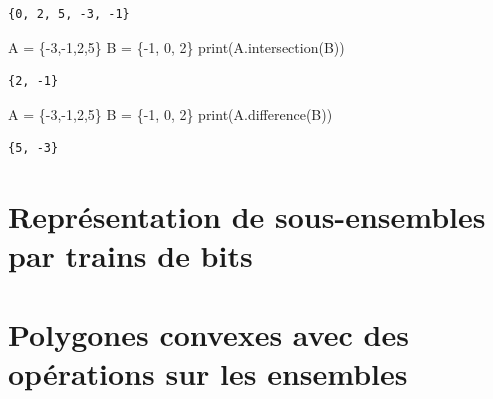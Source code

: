 \documentclass[
  letterpaper,
]{scrbook}
\newenvironment{Shaded}{}{}
\newcommand{\BuiltInTok}[1]{#1}
\newcommand{\DecValTok}[1]{\textcolor[rgb]{0.25,0.63,0.44}{#1}}
\newcommand{\NormalTok}[1]{#1}
\newcommand{\OperatorTok}[1]{\textcolor[rgb]{0.40,0.40,0.40}{#1}}
\theoremstyle{definition}
\theoremstyle{definition}
\theoremstyle{plain}
\theoremstyle{remark}
\begin{document}
\begin{verbatim}
{0, 2, 5, -3, -1}
\end{verbatim}

\hypertarget{intersection-python}{}
\begin{Shaded}
\begin{Highlighting}[]
\NormalTok{A }\OperatorTok{=}\NormalTok{ \{}\OperatorTok{{-}}\DecValTok{3}\NormalTok{,}\OperatorTok{{-}}\DecValTok{1}\NormalTok{,}\DecValTok{2}\NormalTok{,}\DecValTok{5}\NormalTok{\}}
\NormalTok{B }\OperatorTok{=}\NormalTok{ \{}\OperatorTok{{-}}\DecValTok{1}\NormalTok{, }\DecValTok{0}\NormalTok{, }\DecValTok{2}\NormalTok{\}}
\BuiltInTok{print}\NormalTok{(A.intersection(B))}
\end{Highlighting}
\end{Shaded}

\begin{verbatim}
{2, -1}
\end{verbatim}

\hypertarget{difference-python}{}
\begin{Shaded}
\begin{Highlighting}[]
\NormalTok{A }\OperatorTok{=}\NormalTok{ \{}\OperatorTok{{-}}\DecValTok{3}\NormalTok{,}\OperatorTok{{-}}\DecValTok{1}\NormalTok{,}\DecValTok{2}\NormalTok{,}\DecValTok{5}\NormalTok{\}}
\NormalTok{B }\OperatorTok{=}\NormalTok{ \{}\OperatorTok{{-}}\DecValTok{1}\NormalTok{, }\DecValTok{0}\NormalTok{, }\DecValTok{2}\NormalTok{\}}
\BuiltInTok{print}\NormalTok{(A.difference(B))}
\end{Highlighting}
\end{Shaded}

\begin{verbatim}
{5, -3}
\end{verbatim}

\hypertarget{repruxe9sentation-de-sous-ensembles-par-trains-de-bits}{%
\section{Représentation de sous-ensembles par trains de
bits}\label{repruxe9sentation-de-sous-ensembles-par-trains-de-bits}}

\hypertarget{polygones-convexes-avec-des-opuxe9rations-sur-les-ensembles}{%
\section{Polygones convexes avec des opérations sur les
ensembles}\label{polygones-convexes-avec-des-opuxe9rations-sur-les-ensembles}}
\end{document}
